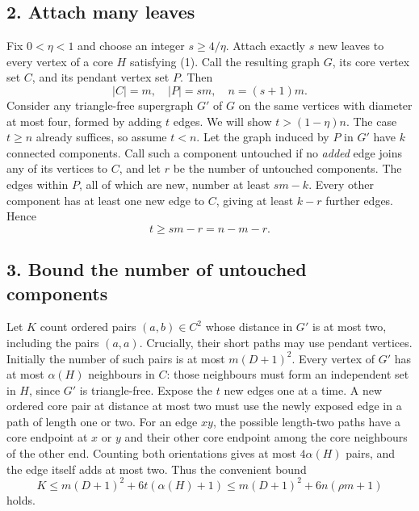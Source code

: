 \subsection*{2. Attach many leaves}
Fix $0<\eta<1$ and choose an integer $s\ge4/\eta$. Attach exactly $s$ new leaves to every vertex of a core $H$ satisfying (1). Call the resulting graph $G$, its core vertex set $C$, and its pendant vertex set $P$. Then
\[
 |C|=m,\quad |P|=sm,\quad n=(s+1)m.
\]
Consider any triangle-free supergraph $G'$ of $G$ on the same vertices with diameter at most four, formed by adding $t$ edges. We will show $t>(1-\eta)n$. The case $t\ge n$ already suffices, so assume $t<n$.
Let the graph induced by $P$ in $G'$ have $k$ connected components. Call such a component untouched if no \emph{added} edge joins any of its vertices to $C$, and let $r$ be the number of untouched components. The edges within $P$, all of which are new, number at least $sm-k$. Every other component has at least one new edge to $C$, giving at least $k-r$ further edges. Hence
\[
 t\ge sm-r=n-m-r. \tag{2}
\]

\subsection*{3. Bound the number of untouched components}
Let $K$ count ordered pairs $(a,b)\in C^2$ whose distance in $G'$ is at most two, including the pairs $(a,a)$. Crucially, their short paths may use pendant vertices.
Initially the number of such pairs is at most $m(D+1)^2$. Every vertex of $G'$ has at most $\alpha(H)$ neighbours in $C$: those neighbours must form an independent set in $H$, since $G'$ is triangle-free.
Expose the $t$ new edges one at a time. A new ordered core pair at distance at most two must use the newly exposed edge in a path of length one or two. For an edge $xy$, the possible length-two paths have a core endpoint at $x$ or $y$ and their other core endpoint among the core neighbours of the other end. Counting both orientations gives at most $4\alpha(H)$ pairs, and the edge itself adds at most two. Thus the convenient bound
\[
 K\le m(D+1)^2+6t(\alpha(H)+1)
 \le m(D+1)^2+6n(\rho m+1) \tag{3}
\]
holds.


